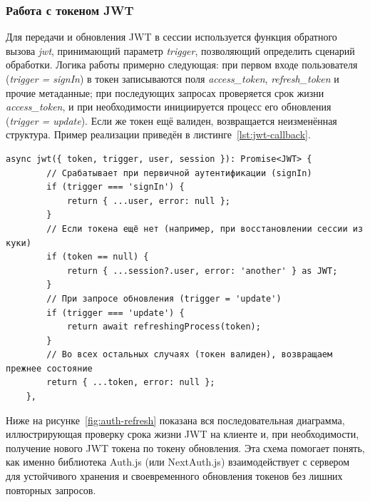 \subsubsection{Работа с токеном JWT}
Для передачи и обновления JWT в сессии используется функция обратного вызова \textit{jwt}, принимающий параметр \textit{trigger}, позволяющий определить сценарий обработки. Логика работы примерно следующая: при первом входе пользователя (\textit{trigger = signIn}) в токен записываются поля \textit{access\_token}, \textit{refresh\_token} и прочие метаданные; при последующих запросах проверяется срок жизни \textit{access\_token}, и при необходимости инициируется процесс его обновления (\textit{trigger = update}). Если же токен ещё валиден, возвращается неизменённая структура. Пример реализации приведён в листинге~\ref{lst:jwt-callback}.

\begin{lstlisting}[caption={JWT-callback с учётом trigger}, label={lst:jwt-callback}]
	async jwt({ token, trigger, user, session }): Promise<JWT> {
		// Срабатывает при первичной аутентификации (signIn)
		if (trigger === 'signIn') {
			return { ...user, error: null };
		}
		// Если токена ещё нет (например, при восстановлении сессии из куки)
		if (token == null) {
			return { ...session?.user, error: 'another' } as JWT;
		}
		// При запросе обновления (trigger = 'update')
		if (trigger === 'update') {
			return await refreshingProcess(token);
		}
		// Во всех остальных случаях (токен валиден), возвращаем прежнее состояние
		return { ...token, error: null };
	},
\end{lstlisting}

Ниже на рисунке~\ref{fig:auth-refresh} показана вся последовательная диаграмма, иллюстрирующая проверку срока жизни JWT на клиенте и, при необходимости, получение нового JWT токена по токену обновления. Эта схема помогает понять, как именно библиотека Auth.js (или NextAuth.js) взаимодействует с сервером для устойчивого хранения и своевременного обновления токенов без лишних повторных запросов.

